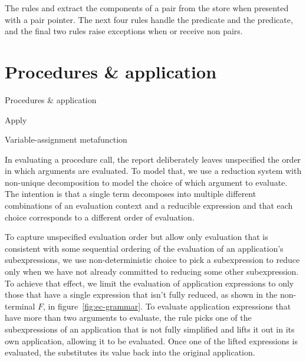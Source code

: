 The rules  and  extract the components of a pair from the store when presented with a pair pointer. The next four rules handle the  predicate and the  predicate, and the final two rules raise exceptions when  or  receive non pairs.

\section{Procedures \& application}

\beginfig
\begin{center}

\end{center}
\caption{Procedures \& application}\label{fig:Procedure--application}
\endfig

\beginfig
\begin{center}


\end{center}
\caption{Apply}\label{fig:Apply}
\endfig

\beginfig
\begin{center}

\end{center}
\caption{Variable-assignment metafunction}\label{fig:varsetd}
\endfig

In evaluating a procedure call, the report deliberately leaves
unspecified the order in which arguments are evaluated. To model that,
we use a reduction system with non-unique decomposition to model the
choice of which argument to evaluate. The intention is that a single
term decomposes into multiple different combinations of an evaluation
context and a reducible expression and that each choice corresponds to
a different order of evaluation.

To capture unspecified evaluation order but allow only evaluation that
is consistent with some sequential ordering of the evaluation of an
application's subexpressions, we use non-deterministic choice to pick
a subexpression to reduce only when we have not already committed to
reducing some other subexpression. To achieve that effect, we limit
the evaluation of application expressions to only those that have a
single expression that isn't fully reduced, as shown in the
non-terminal $F$, in figure~\ref{fig:ec-grammar}. To evaluate
application expressions that have more than two arguments to evaluate,
the rule  picks one of the subexpressions of an
application that is not fully simplified and lifts it out in its own
application, allowing it to be evaluated. Once one of the lifted
expressions is evaluated, the  substitutes its value
back into the original application.


